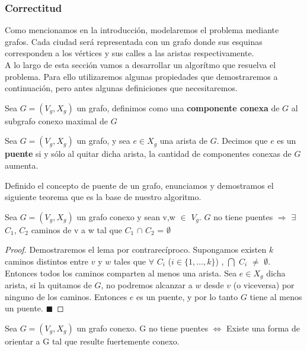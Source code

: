 \subsubsection{Correctitud}

Como mencionamos en la introducción, modelaremos el problema mediante grafos. Cada ciudad será representada con un grafo donde sus esquinas corresponden a los vértices y sus calles a las aristas respectivamente. \\
A lo largo de esta sección vamos a desarrollar un algorítmo que resuelva el problema. Para ello utilizaremos algunas propiedades que demostraremos a continuación, pero antes algunas definiciones que necesitaremos.

\begin{definition}
Sea $G=(V_g,X_g)$ un grafo, definimos como una \textbf{componente conexa} de $G$ al subgrafo conexo maximal de $G$
\end{definition}

\begin{definition}
Sea $G=(V_g,X_g)$ un grafo, y sea $e \in X_g$ una arista de $G$. Decimos que $e$ es un \textbf{puente} si y sólo al quitar dicha arista, la cantidad de componentes conexas de $G$ aumenta.
\end{definition}

Definido el concepto de puente de un grafo, enunciamos y demostramos el siguiente teorema que es la base de nuestro algoritmo.

\begin{lemma}
Sea $G=(V_g,X_g)$ un grafo conexo y sean v,w $\in$ $V_g$. $G$ no tiene puentes $\Rightarrow$ $\exists$ $C_1$, $C_2$ caminos de v a w tal que $C_1$ $\cap$ $C_2$ = $\emptyset$
\end{lemma}

\begin{proof}
Demostraremos el lema por contrarecíproco. Supongamos existen $k$ caminos distintos entre $v$ y $w$ tales que $\forall$ $C_i$ ($i \in \{1,\ldots,k\}$) , $\bigcap$ $C_i$ $\neq$ $\emptyset$. 
Entonces todos los caminos comparten al menos una arista. Sea $e \in X_g$ dicha arista, si la quitamos de $G$, no podremos alcanzar a $w$ desde $v$ (o viceversa) por ninguno de los caminos. 
Entonces $e$ es un puente, y por lo tanto $G$ tiene al menos un puente.  $\blacksquare$
\end{proof}

\begin{theorem}
Sea $G=(V_g,X_g)$ un grafo conexo. G no tiene puentes $\Longleftrightarrow$ Existe una forma de orientar a G tal que resulte fuertemente conexo.
\end{theorem}

